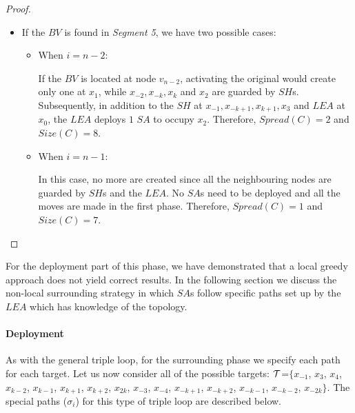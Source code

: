 \begin{proof}
\begin{itemize}
\item If the $BV$ is found in {\em Segment 5}, we have two possible cases:


\begin{itemize}
\item When $ i = n-2$:

If the $BV$ is located at  node $v_{n-2}$, activating the original \bv would create only one \bv at $x_{1}$, while $x_{-2},x_{-k},x_{k}$ and $x_{2}$ are guarded by $SH$s. Subsequently, in addition to the $SH$ at $x_{-1},x_{-k+1},x_{k+1},x_{3}$ and $LEA$ at $x_{0}$, the $LEA$ deploys $1$  $SA$ to occupy $x_{2}$. Therefore, $Spread(C)=2$ and $Size(C)=8$.

\item  When $i=n-1$: %
 
In this case, no more \bvs are created since all the neighbouring nodes are guarded by $SH$s and the $LEA$. No $SA$s need to be deployed and all the moves are made in the first phase. Therefore, $Spread(C)=1$ and $Size(C)=7$.  

\end{itemize}
\end{itemize}
\end{proof}






For the deployment part of this phase, we have demonstrated that a local greedy approach does not yield correct results. In the following section we discuss the non-local surrounding strategy in which  $SA$s follow  specific paths set up by the $LEA$ which has  knowledge of the topology.


\paragraph{Deployment}


As with the general triple loop, for the surrounding phase we specify each path for each target. Let us now consider all of the possible targets: ${\cal T}$=$\{x_{-1}$, $ x_{3}$,  $x_{4}$, $x_{k-2}$, $x_{k-1}$, $x_{k+1}$, $x_{k+2}$, $x_{2k}$, $x_{-3}$, $x_{-4}$, $x_{-k+1}$, $x_{-k+2}$, $x_{-k-1}$, $x_{-k-2}$, $x_{-2k}\}$.  The  special paths ($\sigma_i$) for this type of triple loop are described below. 

